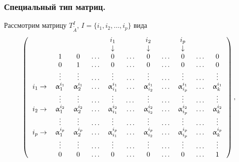 {\begin{frame}
\frametitle{Специальный тип матриц.}
Рассмотрим матрицу $T^I_{\widetilde{A}}$, $I=\{i_1,i_2,\ldots,i_p\}$ вида
\begin{equation*}
\left(\begin{tabular}{ccccccccccc}
&               &         &       &$i_1$        &       &$i_2$       &      &$i_p$       &      &\\
&               &         &       &$\downarrow$ &       &$\downarrow$&      &$\downarrow$&       &\\
&1              &0        &$\ldots$ &0          &$\ldots$ &0         &$\ldots$&0         &$\ldots$&0\\
&0              &1        &$\ldots$ &0          &$\ldots$ &0         &$\ldots$&0         &$\ldots$&0\\
&$\vdots$         &$\vdots$   &$\ldots$ &$\vdots$     &$\ldots$ &$\vdots$    &$\ldots$&$\vdots$    &$\ldots$&$\vdots$     \\
$i_1 \rightarrow$ &$\alpha^{i_1}_1$ &$\alpha^{i_1}_2$ &$\ldots$ &$\alpha^{i_1}_{i_1}$&$\ldots$&$\alpha^{i_1}_{i_2}$&$\ldots$ &$\alpha^{i_1}_{i_p}$&$\ldots$ &$\alpha^{i_1}_{k}$ \\
               &$\vdots$   &$\vdots$   &$\ldots$ &$\vdots$&\ldots&$\vdots$     &$\ldots$ &$\vdots$&$\ldots$ &$\vdots$     \\
$i_2\rightarrow$ &$\alpha^{i_2}_1$ &$\alpha^{i_2}_2$ &$\ldots$ &$\alpha^{i_2}_{i_1}$&$\ldots$ &$\alpha^{i_2}_{i_2}$&$\ldots$ &$\alpha^{i_2}_{i_p}$        &$\ldots$ &$\alpha^{i_2}_{k}$ \\
               &$\vdots$   &$\vdots$   &$\ldots$ &$\vdots$&$\ldots$ &$\vdots$&$\ldots$ &$\vdots$      &$\ldots$ &$\vdots$     \\
$i_p\rightarrow$ &$\alpha^{i_p}_1$ &$\alpha^{i_p}_2$ &$\ldots$ &$\alpha^{i_p}_{i_1}$&$\ldots$ &$\alpha^{i_p}_{i_2}$  &$\ldots$ &$\alpha^{i_p}_{i_p}$      &$\ldots$ &$\alpha^{i_p}_{k}$ \\
               &$\vdots$   &$\vdots$   &$\ldots$ &$\vdots$ &$\ldots$ &$\vdots$&$\ldots$ &$\vdots$        &$\ldots$ &$\vdots$     \\
               &0        &0        &$\ldots$ &0 &$\ldots$ &0     &$\ldots$ &0     &$\ldots$ &1          \\
\end{tabular}\right),
\end{equation*}
\end{frame}

}
